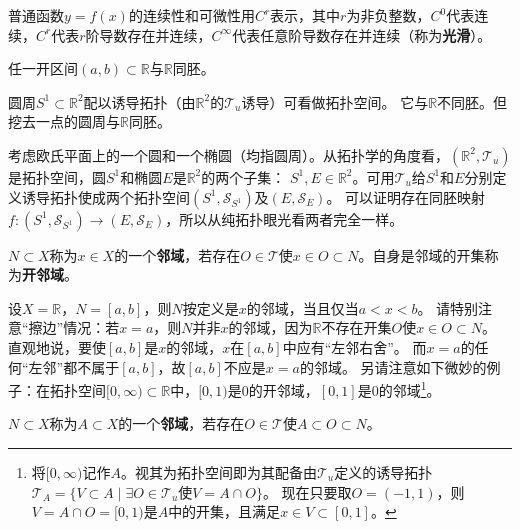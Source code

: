 普通函数$y = f(x)$的连续性和可微性用$C^r$表示，其中$r$为非负整数，$C^0$代表连续，$C^r$代表$r$阶导数存在并连续，$C^\infty$代表任意阶导数存在并连续（称为\textbf{光滑}）。

\begin{example}
任一开区间$(a, b) \subset \mathbb{R}$与$\mathbb{R}$同胚。
\end{example}

\begin{example}
圆周$S^1 \subset \mathbb{R}^2$配以诱导拓扑（由$\mathbb{R}^2$的$\mathscr{T}_u$诱导）可看做拓扑空间。
它与$\mathbb{R}$不同胚。但挖去一点的圆周与$\mathbb{R}$同胚。
\end{example}

\begin{example}
考虑欧氏平面上的一个圆和一个椭圆（均指圆周）。从拓扑学的角度看，$(\mathbb{R}^2, \mathscr{T}_u)$是拓扑空间，圆$S^1$和椭圆$E$是$\mathbb{R}^2$的两个子集：
$S^1, E \in \mathbb{R}^2$。可用$\mathscr{T}_u$给$S^1$和$E$分别定义诱导拓扑使成两个拓扑空间$(S^1, \mathscr{S}_{S^1})$及$(E, \mathscr{S}_E)$。
可以证明存在同胚映射$f \colon (S^1, \mathscr{S}_{S^1}) \to (E, \mathscr{S}_E)$，所以从纯拓扑眼光看两者完全一样。
\end{example}

\begin{definition}
$N \subset X$称为$x \in X$的一个\textbf{邻域}，若存在$O \in \mathscr{T}$使$x \in O \subset N$。自身是邻域的开集称为\textbf{开邻域}。  
\end{definition}

\begin{note}
设$X = \mathbb{R}$，$N = [a, b]$，则$N$按定义是$x$的邻域，当且仅当$a < x < b$。
请特别注意``擦边''情况：若$x = a$，则$N$并非$x$的邻域，因为$\mathbb{R}$不存在开集$O$使$x \in O \subset N$。
直观地说，要使$[a, b]$是$x$的邻域，$x$在$[a, b]$中应有``左邻右舍''。
而$x = a$的任何``左邻''都不属于$[a, b]$，故$[a, b]$不应是$x = a$的邻域。
另请注意如下微妙的例子：在拓扑空间$[0, \infty) \subset \mathbb{R}$中，$[0, 1)$是$0$的开邻域，$[0, 1]$是$0$的邻域\footnote{
将$[0, \infty)$记作$A$。视其为拓扑空间即为其配备由$\mathscr{T}_u$定义的诱导拓扑$\mathscr{T}_A = \{V \subset A \mid \exists O \in \mathscr{T}_u \text{使} V = A \cap O\}$。
现在只要取$O = (-1, 1)$，则$V = A \cap O = [0, 1)$是$A$中的开集，且满足$x \in V \subset [0, 1]$。
}。
\end{note}

\begin{definition}
$N \subset X$称为$A \subset X$的一个\textbf{邻域}，若存在$O \in \mathscr{T}$使$A \subset O \subset N$。
\end{definition}

